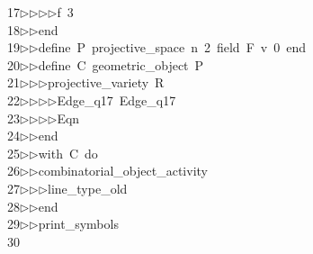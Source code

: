 \begin{tabbing}
17\>$\triangleright$\>$\triangleright$\>$\triangleright$\>$\triangleright$\>f\ 3\ \\[0pt]
18\>$\triangleright$\>$\triangleright$\>end\ \\[0pt]
19\>$\triangleright$\>$\triangleright$\>define\ P\ projective\_space\ n\ 2\ field\ F\ v\ 0\ end\ \\[0pt]
20\>$\triangleright$\>$\triangleright$\>define\ C\ geometric\_object\ P\ \\[0pt]
21\>$\triangleright$\>$\triangleright$\>$\triangleright$\>projective\_variety\ R\ \\[0pt]
22\>$\triangleright$\>$\triangleright$\>$\triangleright$\>$\triangleright$\>Edge\_q17\ Edge\_q17\ \\[0pt]
23\>$\triangleright$\>$\triangleright$\>$\triangleright$\>$\triangleright$\>Eqn\ \\[0pt]
24\>$\triangleright$\>$\triangleright$\>end\ \\[0pt]
25\>$\triangleright$\>$\triangleright$\>with\ C\ do\ \\[0pt]
26\>$\triangleright$\>$\triangleright$\>combinatorial\_object\_activity\ \\[0pt]
27\>$\triangleright$\>$\triangleright$\>$\triangleright$\>line\_type\_old\ \\[0pt]
28\>$\triangleright$\>$\triangleright$\>end\ \\[0pt]
29\>$\triangleright$\>$\triangleright$\>print\_symbols\\[0pt]
30\>\end{tabbing}

